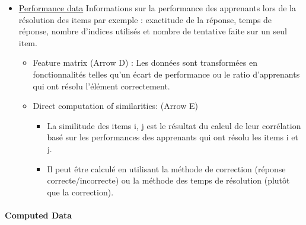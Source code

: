 \begin{itemize}
    \item \underline{Performance data} Informations sur la performance des apprenants lors de la résolution des items par exemple : exactitude de la réponse, temps de réponse, nombre d'indices utilisés et nombre de tentative faite sur un seul item.
    
    \begin{itemize}
		\item Feature matrix (Arrow D) : Les données sont transformées en fonctionnalités telles qu'un écart de performance ou le ratio d'apprenants qui ont résolu l'élément correctement.

		\item Direct computation of similarities: (Arrow E)
		\begin{itemize}
			\item La similitude des items i, j est le résultat du calcul de leur corrélation basé sur les performances des apprenants qui ont résolu les items i et j.
			\item Il peut être calculé en utilisant la méthode de correction (réponse correcte/incorrecte) ou la méthode des temps de résolution (plutôt que la correction).
		\end{itemize}
	\end{itemize}
	
\end{itemize}

\paragraph{Computed Data}

